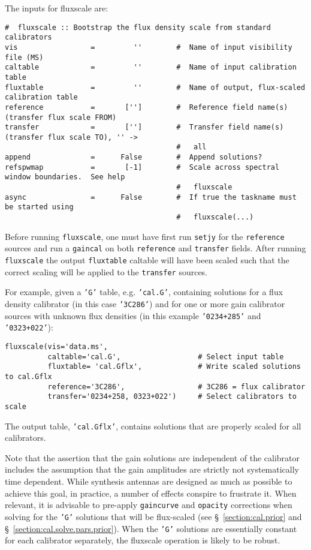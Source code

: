 {The inputs for fluxscale are:
\small
\begin{verbatim}
#  fluxscale :: Bootstrap the flux density scale from standard calibrators
vis                 =         ''        #  Name of input visibility file (MS)
caltable            =         ''        #  Name of input calibration table
fluxtable           =         ''        #  Name of output, flux-scaled calibration table
reference           =       ['']        #  Reference field name(s) (transfer flux scale FROM)
transfer            =       ['']        #  Transfer field name(s) (transfer flux scale TO), '' ->
                                        #   all
append              =      False        #  Append solutions?
refspwmap           =       [-1]        #  Scale across spectral window boundaries.  See help
                                        #   fluxscale
async               =      False        #  If true the taskname must be started using
                                        #   fluxscale(...)
\end{verbatim}
\normalsize

Before running {\tt fluxscale}, one must have first run {\tt setjy} for the
{\tt reference} sources and run a {\tt gaincal} on both {\tt reference}
and {\tt transfer} fields.  After running {\tt fluxscale} the output
{\tt fluxtable} caltable will have been scaled such that the correct
scaling will be applied to the {\tt transfer} sources.

For example, given a {\tt 'G'} table, e.g. {\tt 'cal.G'},
containing solutions for a flux density calibrator (in this case 
{\tt '3C286'}) and for one or more gain calibrator sources with
unknown flux densities (in this example {\tt '0234+285'} and 
{\tt '0323+022'}):
\small
\begin{verbatim}
fluxscale(vis='data.ms',
          caltable='cal.G',                  # Select input table
          fluxtable= 'cal.Gflx',             # Write scaled solutions to cal.Gflx
          reference='3C286',                 # 3C286 = flux calibrator
          transfer='0234+258, 0323+022')     # Select calibrators to scale
\end{verbatim}
\normalsize
The output table, {\tt 'cal.Gflx'}, contains solutions that are properly scaled
for all calibrators.

Note that the assertion that the gain solutions are independent of the
calibrator includes the assumption that the gain amplitudes are
strictly not systematically time dependent.  While synthesis antennas
are designed as much as possible to achieve this goal, in practice, a
number of effects conspire to frustrate it.  When relevant, it is
advisable to pre-apply {\tt gaincurve} and {\tt opacity} 
corrections when solving
for the {\tt 'G'} solutions that will be flux-scaled (see 
\S~\ref{section:cal.prior} and \S~\ref{section:cal.solve.pars.prior}).
When the {\tt 'G'} solutions are essentially constant for each
calibrator separately, the fluxscale operation is likely to be robust.

}
